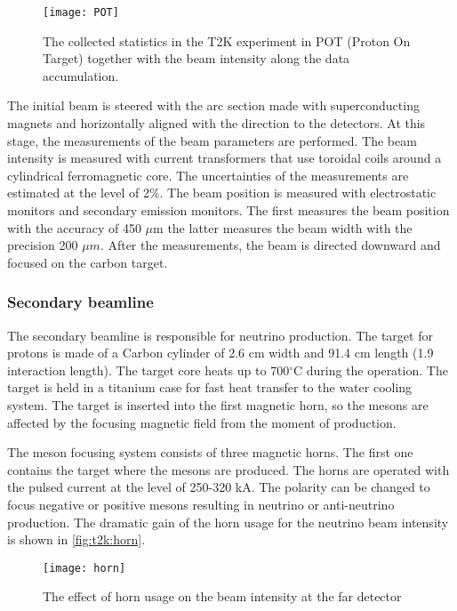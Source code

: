 \documentclass[../main.tex]{subfiles}
\begin{document}
\begin{figure}[!ht]
  \centering
  \texttt{[image: POT]}
  \caption{The collected statistics in the T2K experiment in POT (Proton On Target) together with the beam intensity along the data accumulation.}
  \label{fig:t2k:POT}
\end{figure}

The initial beam is steered with the arc section made with superconducting magnets and horizontally aligned with the direction to the detectors. At this stage, the measurements of the beam parameters are performed. The beam intensity is measured with current transformers that use toroidal coils around a cylindrical ferromagnetic core. The uncertainties of the measurements are estimated at the level of 2\%. The beam position is measured with electrostatic monitors and secondary emission monitors. The first measures the beam position with the accuracy of 450 $\mu \text{m}$ the latter measures the beam width with the precision 200 $\mu m$. After the measurements, the beam is directed downward and focused on the carbon target.

\subsubsection{Secondary beamline}
The secondary beamline is responsible for neutrino production. The target for protons is made of a Carbon cylinder of 2.6 cm width and 91.4 cm length (1.9 interaction length). The target core heats up to 700$^\circ$C during the operation. The target is held in a titanium case for fast heat transfer to the water cooling system. The target is inserted into the first magnetic horn, so the mesons are affected by the focusing magnetic field from the moment of production.

The meson focusing system consists of three magnetic horns. The first one contains the target where the mesons are produced. The horns are operated with the pulsed current at the level of 250-320 kA. The polarity can be changed to focus negative or positive mesons resulting in neutrino or anti-neutrino production. The dramatic gain of the horn usage for the neutrino beam intensity is shown in \autoref{fig:t2k:horn}.

\begin{figure}[!ht]
  \centering
    \texttt{[image: horn]}
    \caption{The effect of horn usage on the beam intensity at the far detector}
    \label{fig:t2k:horn}
\end{figure}
\end{document}
